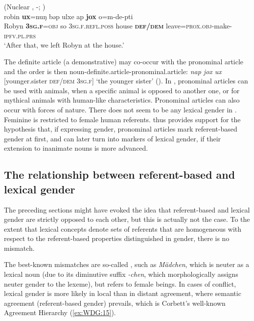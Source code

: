 \documentclass[output=collectionpaper]{langsci/langscibook}
\begin{document}
\ea\label{ex:WDG:14}
 (Nuclear , -; \citealt[180]{Loughnane2009})\\
\gll robin	\textbf{ux}=nuŋ	bəp	ulxe	ap	\textbf{jox} o=m-de-pti\\
Robyn	\textbf{3\textsc{sg.f}}=\textsc{obj}	so	3\textsc{sg.f.refl.poss}	house	\textbf{\textsc{def/dem}} leave=\textsc{prox.obj}-make-\textsc{ipfv.pl.prs}\\
\glt `After that, we left Robyn at the house.'\\
\z

The  definite article (a demonstrative) may co-occur with the pronominal article and the order is then noun-definite.article-pronominal.article: \textit{nap jox ux} [younger.sister \textsc{def/dem 3sg.f}] `the younger sister' (\citealt[128]{Loughnane2009}). In , pronominal articles can be used with animals, when a specific animal is opposed to another one, or for mythical animals with human-like characteristics. Pronominal articles can also occur with forces of nature. There does not seem to be any lexical gender in . Feminine is restricted to female human referents.  thus provides support for the hypothesis that, if expressing gender, pronominal articles mark referent-based gender at first, and can later turn into markers of lexical gender, if their extension to inanimate nouns is more advanced.


  \subsection{The relationship between referent-based and lexical gender}
\label{sec:WDG:3.6}

The preceding sections might have evoked the idea that referent-based and lexical gender are strictly opposed to each other, but this is actually not the case. To the extent that lexical concepts denote sets of referents that are homogeneous with respect to the referent-based properties distinguished in gender, there is no mismatch.

The best-known mismatches are so-called , such as  \textit{Mädchen}, which is neuter as a lexical noun (due to its diminutive suffix \textit{-chen}, which morphologically assigns neuter gender to the lexeme), but refers to female beings. In cases of conflict, lexical gender is more likely in local than in distant agreement, where semantic agreement (referent-based gender) prevails, which is Corbett's well-known Agreement Hierarchy (\ref{ex:WDG:15}).
\end{document}
